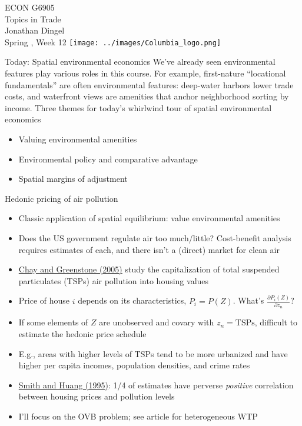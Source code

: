 \documentclass[11pt,notes=hide,aspectratio=169]{beamer}
\begin{document}
\begin{frame}[plain]
\begin{center}
\large
\textcolor{columbiadarkblue}{ECON G6905\\
Topics in Trade\\ 
Jonathan Dingel\\
Spring \the\year, Week 12}
\vfill 
\texttt{[image: ../images/Columbia\_logo.png]}
\end{center}
\end{frame}
\begin{frame}{Today: Spatial environmental economics}
We've already seen environmental features play various roles in this course.
For example, 
first-nature ``locational fundamentals'' are often environmental features:
deep-water harbors lower trade costs,
and
waterfront views are amenities that anchor neighborhood sorting by income.
\vspace{1cm}
Three themes for today's whirlwind tour of spatial environmental economics
\begin{itemize}
	\item Valuing environmental amenities
	\item Environmental policy and comparative advantage
	\item Spatial margins of adjustment 
\end{itemize}
\end{frame}
\begin{frame}{Hedonic pricing of air pollution}
\begin{itemize}
\item Classic application of spatial equilibrium: value environmental amenities
\item Does the US government regulate air too much/little? Cost-benefit analysis requires estimates of each, and there isn't a (direct) market for clean air
\item \href{https://doi.org/10.1086/427462}{Chay and Greenstone (2005)} study the capitalization of total suspended particulates (TSPs) air pollution into housing values
\item Price of house $i$ depends on its characteristics, $P_i = P(Z)$. What's $\frac{\partial P_i(Z)}{\partial z_n}$?
\item If some elements of $Z$ are unobserved and covary with $z_n = \text{TSPs}$, difficult to estimate the hedonic price schedule
\item E.g., areas with higher levels of TSPs tend to be more urbanized and have higher per capita incomes, population densities, and crime rates
\item \href{https://doi.org/10.1086/261981}{Smith and Huang (1995)}: 1/4 of estimates have perverse \textit{positive} correlation between housing prices and pollution levels
\item I'll focus on the OVB problem; see article for heterogeneous WTP
\end{itemize}
\end{frame}
\end{document}
